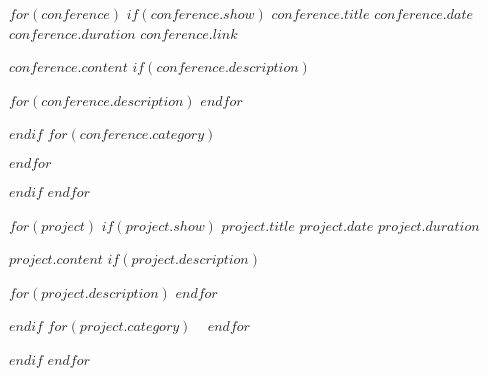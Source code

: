 \documentclass[a4paper]{article}
\begin{document}

$for(conference)$
$if(conference.show)$
\cvexperiencetitlesmalllink%
  {$conference.title$}%
  {$conference.date$}%
  {$conference.duration$}%
  {$conference.link$}%

\begin{cvexperience}%
  $conference.content$%
$if(conference.description)$

  \begin{cvexperiencedescription}%
$for(conference.description)$
$endfor$
  \end{cvexperiencedescription}%
$endif$
$for(conference.category)$

  \begin{cvexperiencetech}%
  \end{cvexperiencetech}%
$endfor$
\end{cvexperience}%

$endif$
$endfor$



$for(project)$
$if(project.show)$
\cvexperiencetitlesmall%
  {$project.title$}%
  {$project.date$}%
  {$project.duration$}%

\begin{cvexperiencesingle}%
  $project.content$%
$if(project.description)$

  \begin{cvexperiencedescription}%
$for(project.description)$
$endfor$
  \end{cvexperiencedescription}%
$endif$
$for(project.category)$
  \ %
$endfor$
\end{cvexperiencesingle}%

$endif$
$endfor$

\end{document}
